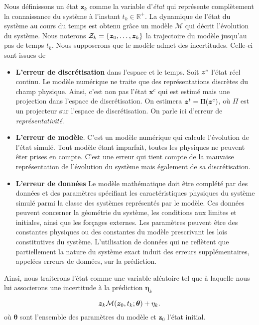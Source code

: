 Nous définissons un état $\bm z_k$ comme la variable d'\textit{état} qui représente complètement la connaissance du système à l'instant $t_k \in \mathbb R^+$. La dynamique de l'état du système au cours du temps est obtenu grâce un modèle $\mathcal{M}$ qui décrit l'évolution du système.
Nous noterons $\mathcal Z_k = \{\bm z_0, \dots, \bm z_k\}$ la trajectoire du modèle jusqu'au pas de temps $t_k$.
Nous supposerons que le modèle admet des incertitudes. Celle-ci sont issues de

\begin{itemize}
    \item \textbf{L'erreur de discrétisation} dans l'espace et le temps. Soit $\bm z^c$ l'état réel continu. Le modèle numérique ne traite que des représentations discrètes du champ physique. Ainsi, c'est non pas l'état $\bm x^c$ qui est estimé mais une projection dans l'espace de discrétisation. On estimera $\bm z^t = \Pi(\bm z^c)$, où $\Pi$ est un projecteur sur l'espace de discrétisation. On parle ici d'erreur de \textit{représentativité}.
    \item \textbf{L'erreur de modèle}. C'est un modèle numérique qui calcule l'évolution de l'état simulé. Tout modèle étant imparfait, toutes les physiques ne peuvent êter prises en compte. C'est une erreur qui tient compte de la mauvaise représentation de l'évolution du système mais également de sa discrétisation.
    \item \textbf{L'erreur de données} Le modèle mathématique doit être complété par des données et des paramètres spécifiant les caractéristiques physiques du système simulé parmi la classe des systèmes représentés par le modèle. Ces données peuvent concerner la géométrie du système, les conditions aux limites et initiales, ainsi que les forçages externes. Les paramètres peuvent être des constantes physiques ou des constantes du modèle prescrivant les lois constitutives du système. L'utilisation de données qui ne reflètent que partiellement la nature du système exact induit des erreurs supplémentaires, appelées erreurs de données, sur la prédiction.
\end{itemize}

Ainsi, nous traiterons l'état comme une variable aléatoire tel que à laquelle nous lui associerons une incertitude à la prédiction $\bm \eta_k$

\begin{equation*}
    \bm z_k \mathcal{M}(\bm z_0, t_k ; \bm \theta) + \eta_k.
\end{equation*}
où $\bm \theta$ sont l'ensemble des paramètres du modèle et $\bm z_0$ l'état initial.

